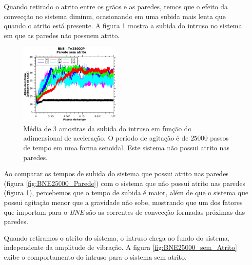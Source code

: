     Quando retirado o atrito entre os grãos e as paredes, temos que o efeito da convecção no sistema diminui, ocasionando em uma subida mais lenta que quando o atrito está presente. A figura \ref{fig:BNE25000_sem_Atrito_Parede} mostra a subida do intruso no sistema em que as paredes não possuem atrito.

\begin{figure}
    \centering
    \includegraphics[width=0.45\textwidth]{04-figuras/BNE25000PsemAtrito.png}
    \caption{Média de $3$ amostras da subida do intruso em função do adimensional de aceleração. O período de agitação é de $25000$ passos de tempo em uma forma senoidal. Este sistema não possui atrito nas paredes.}
    \label{fig:BNE25000_sem_Atrito_Parede}
\end{figure}

    Ao comparar os tempos de subida do sistema que possui atrito nas paredes (figura \ref{fig:BNE25000_Parede}) com o sistema que não possui atrito nas paredes (figura \ref{fig:BNE25000_sem_Atrito_Parede}), percebemos que o tempo de subida é maior, além de que o sistema que possui agitação menor que a gravidade não sobe, mostrando que um dos fatores que importam para o \textit{BNE} são as correntes de convecção formadas próximas das paredes.

    Quando retiramos o atrito do sistema, o intruso chega ao fundo do sistema, independente da amplitude de vibração. A figura \ref{fig:BNE25000_sem_Atrito} exibe o comportamento do intruso para o sistema sem atrito.

